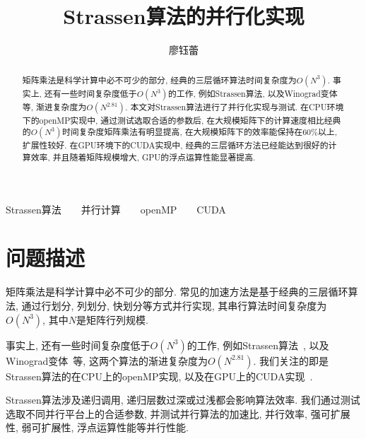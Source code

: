 \documentclass[szjs]{cjcmltx}
\begin{document}
\def\Jvol{}
\def\Jno{}
\def\Jyear{2020}
\def\Jmonth{11}
\def\Jreceived{~	}
\def\Jrevised{}

\def\Term{中国科学院大学2020\ -\ 2021学年秋季学期}
\def\Major{计算数学}
\def\Aid{201928000206026}

\setcounter{page}{1}



\title{Strassen算法的并行化实现}

\author{廖钰蕾
    }

\maketitle

\begin{abstract}
矩阵乘法是科学计算中必不可少的部分, 经典的三层循环算法时间复杂度为$O(N^3)$. 事实上, 还有一些时间复杂度低于$O(N^3)$的工作, 例如Strassen算法, 以及Winograd变体等, 渐进复杂度为$O(N^{2.81})$. 本文对Strassen算法进行了并行化实现与测试. 在CPU环境下的openMP实现中, 通过测试选取合适的参数后, 在大规模矩阵下的计算速度相比经典的$O(N^3)$时间复杂度矩阵乘法有明显提高, 在大规模矩阵下的效率能保持在60\%以上, 扩展性较好. 在GPU环境下的CUDA实现中, 经典的三层循环方法已经能达到很好的计算效率, 并且随着矩阵规模增大, GPU的浮点运算性能显著提高.
\end{abstract}

\begin{keywords}
Strassen算法\ \ \ \ 并行计算\ \ \ \ openMP\ \ \ \ CUDA
\end{keywords}

\section{问题描述}
矩阵乘法是科学计算中必不可少的部分. 常见的加速方法是基于经典的三层循环算法, 通过行划分, 列划分, 快划分等方式并行实现, 其串行算法时间复杂度为$O(N^3)$, 其中$N$是矩阵行列规模. 

事实上, 还有一些时间复杂度低于$O(N^3)$的工作, 例如Strassen算法~\cite{Strassen:1969}, 以及Winograd变体~\cite{Winograd:1971}等, 这两个算法的渐进复杂度为$O(N^{2.81})$. 我们关注的即是Strassen算法的在CPU上的openMP实现, 以及在GPU上的CUDA实现~\cite{Li:2011}.

 Strassen算法涉及递归调用, 递归层数过深或过浅都会影响算法效率. 我们通过测试选取不同并行平台上的合适参数, 并测试并行算法的加速比, 并行效率, 强可扩展性, 弱可扩展性, 浮点运算性能等并行性能.
\end{document}
